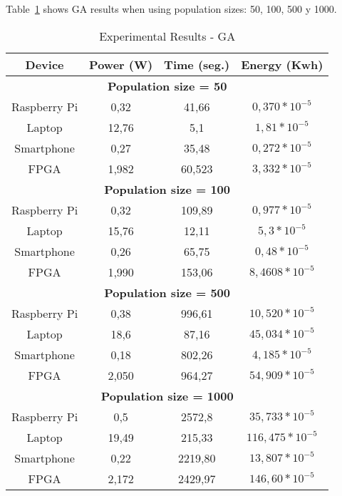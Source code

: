 \begin{small}
\begin{table}[!ht]
\begin{tabular}{ccccc}
\end{tabular}
\end{table} 
\end{small}


Table~\ref{Table:result_ga} shows GA results when using population sizes: 50, 100, 500 y 1000.

\vspace{-0.5cm}
\begin{table}[!ht]
\renewcommand{\arraystretch}{1.3}
\centering
\caption{Experimental Results - GA}
\label{Table:result_ga}
\begin{tabular}{cccc} \hline
Device & Power (W) & Time (seg.) & Energy (Kwh) \\ \hline
\multicolumn{4}{c}{\textbf{Population size = 50}}\\ %
 Raspberry Pi & 0,32 & 41,66 &  $0,370*10^{-5}$ \\
 Laptop & 12,76 & 5,1 & $1,81*10^{-5}$ \\
 Smartphone & 0,27 & 35,48 & $0,272*10^{-5}$ \\
 FPGA & 1,982 & 60,523 & $3,332*10^{-5}$\\  \hline
\multicolumn{4}{c}{\textbf{Population size = 100}}\\ %
 Raspberry Pi & 0,32 & 109,89 &  $0,977*10^{-5}$ \\
 Laptop & 15,76 & 12,11 & $5,3*10^{-5}$ \\
 Smartphone & 0,26 & 65,75 & $0,48*10^{-5}$ \\
 FPGA & 1,990 & 153,06 & $8,4608*10^{-5}$ \\ \hline
\multicolumn{4}{c}{\textbf{Population size = 500}}\\ %
 Raspberry Pi & 0,38 & 996,61 &  $10,520*10^{-5}$ \\
 Laptop & 18,6 & 87,16 & $45,034*10^{-5}$ \\
 Smartphone & 0,18 & 802,26 & $4,185*10^{-5}$ \\
 FPGA & 2,050 & 964,27& $54,909*10^{-5}$\\ \hline
\multicolumn{4}{c}{\textbf{Population size = 1000}}\\ %
 Raspberry Pi & 0,5 & 2572,8 &  $35,733*10^{-5}$ \\
 Laptop & 19,49 & 215,33 & $116,475*10^{-5}$ \\
 Smartphone & 0,22 & 2219,80 & $13,807*10^{-5}$ \\
 FPGA & 2,172 &2429,97 & $146,60*10^{-5}$\\ \hline
\end{tabular}
\end{table} 


